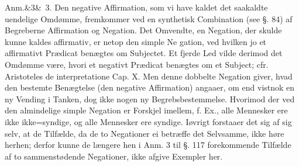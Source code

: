 \documentclass[12pt]{book}
\def\sperr#1{#1}%
\def\textit#1{#1}%
\def\emph#1{#1}%
\newcommand{\sperr}[1]{\textls[180]{#1}}
\newcommand{\anm}[1]{%
  \par\vspace{0.5\baselineskip}%
  \noindent\hspace{\parindent}\sperr{Anm.}\ifx&#1&\else~\textit{#1}.\fi
  \enspace\ignorespaces
}
\newcommand{\opage}[1]{\marginnote{\footnotesize\textit{[#1]}}}
\begin{document}
\anm{3} Den negative \emph{Affirmation}, som vi have kaldet det saakaldte uendelige
Omdømme, fremkommer ved en synthetisk Combination (see §. 84) af Begreberne
\emph{Affirmation} og Negation. Det Omvendte, en Negation, der skulde kunne kaldes
\textit{affirmativ}, er netop den simple Ne%
\opage{276}%
gation, ved hvilken jo et affirmativt Prædicat benægtes om Subjectet. Et fjerde Led
vilde derimod det Omdømme være, hvori et negativt Prædicat benægtes om et Subject;
cfr. \textit{Aristoteles de interpretatione Cap. X.} Men denne dobbelte Negation
giver, hvad den bestemte Benægtelse (den negative Affirmation) angaaer, om end vistnok
en ny Vending i Tanken, dog ikke nogen ny Begrebsbestemmelse. Hvorimod der ved den
almindelige simple Negation er Forskjel imellem, f. Ex., alle Mennesker ere ikke
ikke=syndige, og alle Mennesker ere syndige. Iøvrigt forstaaer det sig af sig selv, at
de Tilfælde, da de to Negationer ei betræffe det Selvsamme, ikke høre herhen; derfor
kunne de længere hen i Anm. 3 til §. 117 forekommende Tilfælde af to sammenstødende
Negationer, ikke afgive Exempler her.
\end{document}
